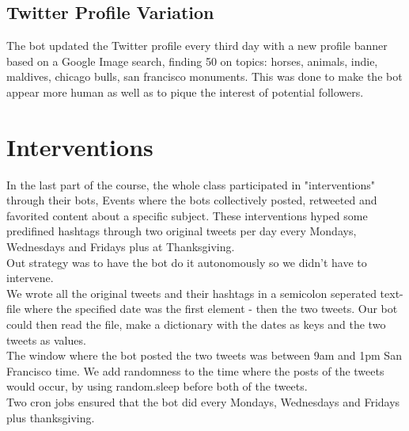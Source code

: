 \documentclass[10pt]{IEEEtran}
\begin{document}
\subsection{Twitter Profile Variation}
The bot updated the Twitter profile every third day with a new profile banner based on a Google Image search, finding 50 on topics: horses, animals, indie, maldives, chicago bulls, san francisco monuments. This was done to make the bot appear more human as well as to pique the interest of potential followers.

\section{Interventions}
In the last part of the course, the whole class participated in "interventions" through their bots, Events where the bots collectively posted, retweeted and favorited content about a specific subject. These interventions hyped some predifined hashtags through two original tweets per day every Mondays, Wednesdays and Fridays plus at Thanksgiving. \\
Out strategy was to have the bot do it autonomously so we didn't have to intervene. \\

We wrote all the original tweets and their hashtags in a semicolon seperated text-file where the specified date was the first element - then the two tweets. Our bot could then read the file, make a dictionary with the dates as keys and the two tweets as values. \\

The window where the bot posted the two tweets was between 9am and 1pm San Francisco time. We add randomness to the time where the posts of the tweets would occur, by using random.sleep before both of the tweets.\\
Two cron jobs ensured that the bot did every Mondays, Wednesdays and Fridays plus thanksgiving.\\\\\\\\
\end{document}
